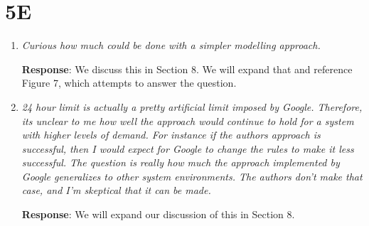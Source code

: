 \documentclass{article}
\newcommand{\resp}[1]{\textbf{Response}: #1}
\newcommand{\revmade}[1]{\textbf{Revision Made}: #1}
\begin{document}
\section{5E}

\begin{enumerate}

\item \emph{Curious how much could be done with a simpler modelling approach.}

\resp{We discuss this in Section 8. We will expand that and reference Figure 7, which attempts to answer the question.}

\item \emph{24 hour limit is actually a pretty artificial limit imposed by Google. Therefore, its unclear to me how well the approach would continue to hold for a system with higher levels of demand. For instance if the authors approach is successful, then I would expect for Google to change the rules to make it less successful. The question is really how much the approach implemented by Google generalizes to other system environments. The authors don't make that case, and I'm skeptical that it can be made.}

\resp{We will expand our discussion of this in Section 8.}



\end{enumerate}
\end{document}
